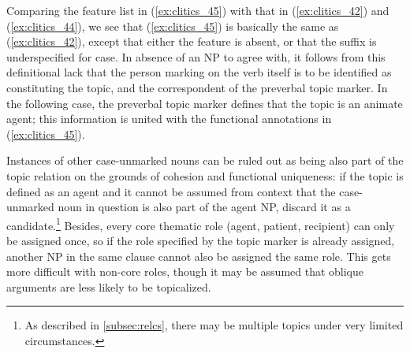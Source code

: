 Comparing the feature list in (\ref{ex:clitics_45}) with that in
(\ref{ex:clitics_42}) and (\ref{ex:clitics_44}), we see that
(\ref{ex:clitics_45}) is basically the same as (\ref{ex:clitics_42}), except
that either the \Case{} feature is absent, or that the suffix is
underspecified for case. In absence of an NP to agree with, it follows from
this definitional lack that the person marking on the verb itself is to be
identified as constituting the topic, and the correspondent of the preverbal
topic marker. In the following case, the preverbal topic marker defines that
the topic is an animate agent; this information is united with the functional
annotations in (\ref{ex:clitics_45}).

\begin{figure}
\begin{morphlex}
\ex\label{ex:clitics_46}
\xe
\end{morphlex}
\end{figure}

Instances of other case-unmarked nouns can be ruled out as being also part of
the topic relation on the grounds of cohesion and functional uniqueness: if the
topic is defined as an agent and it cannot be assumed from context that the
case-unmarked noun in question is also part of the agent NP, discard it as a
candidate.\footnote{As described in \autoref{subsec:relcs}, there may be
multiple topics under very limited circumstances.} Besides, every core thematic
role (agent, patient, recipient) can only be assigned once, so if the role
specified by the topic marker is already assigned, another NP in the same
clause cannot also be assigned the same role. This gets more difficult with
non-core roles, though it may be assumed that oblique arguments are less likely
to be topicalized.

